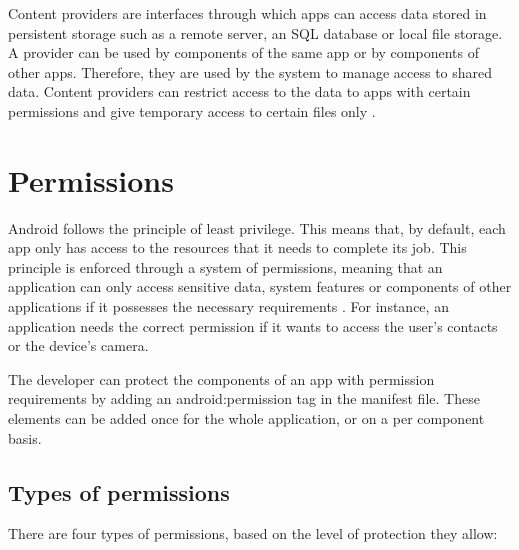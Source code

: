     Content providers are interfaces through which apps can access data stored in persistent storage such as a remote server, an SQL database or local file storage. A provider can be used by components of the same app or by components of other apps. Therefore, they are used by the system to manage access to shared data. Content providers can restrict access to the data to apps with certain permissions and give temporary access to certain files only \cite{android_app_fundamentals}.
    
    \section{Permissions}
        \label{sec:permissions}
        
    Android follows the principle of least privilege. This means that, by default, each app only has access to the resources that it needs to complete its job. This principle is enforced through a system of permissions, meaning that an application can only access sensitive data, system features or components of other applications if it possesses the necessary requirements \cite{permissions_guide}. For instance, an application needs the correct permission if it wants to access the user’s contacts or the device’s camera.
    
    The developer can protect the components of an app with permission requirements by adding an android:permission tag in the manifest file. These elements can be added once for the whole application, or on a per component basis.
    
    \subsection{Types of permissions}
        \label{subsec:types_of_permissions}
        
    There are four types of permissions, based on the level of protection they allow:
    
